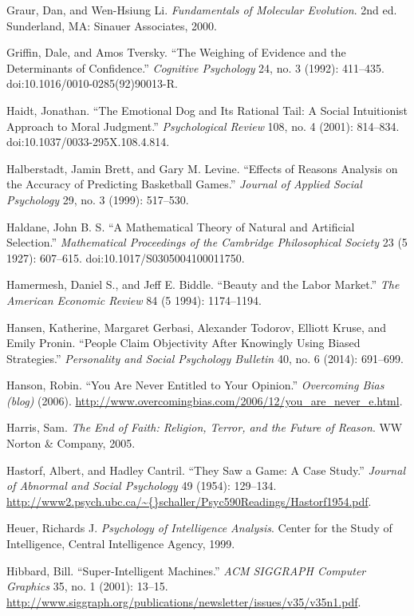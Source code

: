 {
 Graur, Dan, and Wen-Hsiung Li. \textit{Fundamentals of Molecular
Evolution}. 2nd ed. Sunderland, MA: Sinauer Associates, 2000.}

{
 Griffin, Dale, and Amos Tversky. ``The Weighing
of Evidence and the Determinants of Confidence.''
\textit{Cognitive Psychology} 24, no. 3 (1992): 411--435.
doi:10.1016/0010-0285(92)90013-R.}

{
 Haidt, Jonathan. ``The Emotional Dog and Its
Rational Tail: A Social Intuitionist Approach to Moral
Judgment.'' \textit{Psychological Review} 108, no. 4
(2001): 814--834. doi:10.1037/0033-295X.108.4.814.}

{
 Halberstadt, Jamin Brett, and Gary M. Levine.
``Effects of Reasons Analysis on the Accuracy of
Predicting Basketball Games.'' \textit{Journal of
Applied Social Psychology} 29, no. 3 (1999): 517--530.}

{
 Haldane, John B. S. ``A Mathematical Theory of
Natural and Artificial Selection.''
\textit{Mathematical Proceedings of the Cambridge Philosophical
Society} 23 (5 1927): 607--615. doi:10.1017/S0305004100011750.}

{
 Hamermesh, Daniel S., and Jeff E. Biddle.
``Beauty and the Labor Market.''
\textit{The American Economic Review} 84 (5 1994): 1174--1194.}

{
 Hansen, Katherine, Margaret Gerbasi, Alexander Todorov, Elliott
Kruse, and Emily Pronin. ``People Claim Objectivity
After Knowingly Using Biased Strategies.''
\textit{Personality and Social Psychology Bulletin} 40, no. 6 (2014):
691--699.}

{
 Hanson, Robin. ``You Are Never Entitled to Your
Opinion.'' \textit{Overcoming Bias (blog)} (2006).
\url{http://www.overcomingbias.com/2006/12/you\_are\_never\_e.html}.}

{
 Harris, Sam. \textit{The End of Faith: Religion, Terror, and the
Future of Reason}. WW Norton \& Company, 2005.}

{
 Hastorf, Albert, and Hadley Cantril. ``They Saw a
Game: A Case Study.'' \textit{Journal of Abnormal and
Social Psychology} 49 (1954): 129--134.
\url{http://www2.psych.ubc.ca/\~{}schaller/Psyc590Readings/Hastorf1954.pdf}.}

{
 Heuer, Richards J. \textit{Psychology of Intelligence Analysis}.
Center for the Study of Intelligence, Central Intelligence Agency,
1999.}

{
 Hibbard, Bill. ``Super-Intelligent
Machines.'' \textit{ACM SIGGRAPH Computer Graphics}
35, no. 1 (2001): 13--15.
\url{http://www.siggraph.org/publications/newsletter/issues/v35/v35n1.pdf}.}

